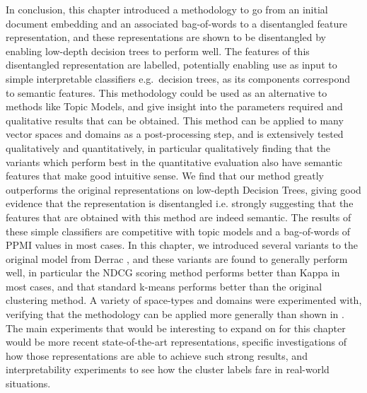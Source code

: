In conclusion, this chapter introduced a methodology to go from an initial document embedding and an associated bag-of-words to a disentangled feature representation, and these representations are shown to be disentangled by enabling low-depth decision trees to perform well. The features of this disentangled representation are labelled, potentially enabling use as input to simple interpretable classifiers e.g.\  decision trees, as its components correspond to semantic features. This methodology could be used as an alternative to methods like Topic Models, and give insight into the parameters required and qualitative results that can be obtained. This method can be applied to many vector spaces and domains as a post-processing step, and is extensively tested qualitatively and quantitatively, in particular qualitatively finding that the variants which perform best in the quantitative evaluation also have semantic features that make good intuitive sense. We find that our method greatly outperforms the original representations on low-depth Decision Trees, giving good evidence that  the representation is disentangled i.e.  strongly suggesting that the features that are obtained with this method are indeed semantic. The results of these simple classifiers are competitive with topic models and a bag-of-words of PPMI values in most cases. In this chapter, we introduced several variants to the original model from Derrac \cite{Derrac2015}, and these variants are found to generally perform well, in particular the NDCG scoring method performs better than Kappa in most cases, and that standard k-means performs better than the original clustering method. A variety of space-types and domains were experimented with, verifying that the methodology can be applied more generally than shown in \cite{Derrac2015}. The main experiments that would be interesting to expand on for this chapter would be more recent state-of-the-art representations, specific investigations of how those representations are able to achieve such strong results, and interpretability experiments to see how the cluster labels fare in real-world situations.
